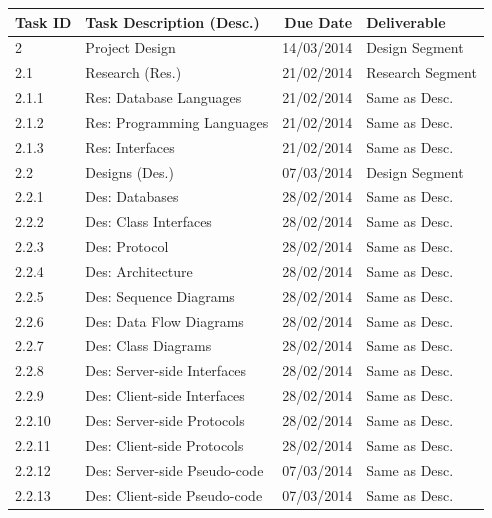 \pagebreak

\begin{tabular}{llrl}
    
    \toprule
    
    Task ID  & Task Description (Desc.)     & Due Date    & Deliverable       \\
    
    \midrule
    
    2        & Project Design               & 14/03/2014  & Design Segment    \\
    
    \cmidrule(r){2-3}
    2.1      & Research (Res.)              & 21/02/2014  & Research Segment  \\
    2.1.1    & Res: Database Languages      & 21/02/2014  & Same as Desc.     \\
    2.1.2    & Res: Programming Languages   & 21/02/2014  & Same as Desc.     \\
    2.1.3    & Res: Interfaces              & 21/02/2014  & Same as Desc.     \\
    \cmidrule(r){2-3}
    
    2.2      & Designs (Des.)               & 07/03/2014  & Design Segment    \\
    2.2.1    & Des: Databases               & 28/02/2014  & Same as Desc.     \\
    2.2.2    & Des: Class Interfaces        & 28/02/2014  & Same as Desc.     \\
    2.2.3    & Des: Protocol                & 28/02/2014  & Same as Desc.     \\
    2.2.4    & Des: Architecture            & 28/02/2014  & Same as Desc.     \\
    2.2.5    & Des: Sequence Diagrams       & 28/02/2014  & Same as Desc.     \\
    2.2.6    & Des: Data Flow Diagrams      & 28/02/2014  & Same as Desc.     \\
    2.2.7    & Des: Class Diagrams          & 28/02/2014  & Same as Desc.     \\
    2.2.8    & Des: Server-side Interfaces  & 28/02/2014  & Same as Desc.     \\
    2.2.9    & Des: Client-side Interfaces  & 28/02/2014  & Same as Desc.     \\
    2.2.10   & Des: Server-side Protocols   & 28/02/2014  & Same as Desc.     \\
    2.2.11   & Des: Client-side Protocols   & 28/02/2014  & Same as Desc.     \\
    2.2.12   & Des: Server-side Pseudo-code & 07/03/2014  & Same as Desc.     \\
    2.2.13   & Des: Client-side Pseudo-code & 07/03/2014  & Same as Desc.     \\
    \cmidrule(r){2-3}
    

\end{tabular}
